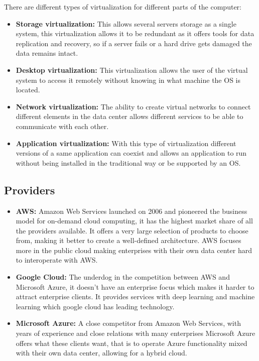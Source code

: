 There are different types of virtualization for different parts of the computer:

\begin{itemize}
	\item{\textbf{Storage virtualization:} This allows several servers storage as a single system, this virtualization allows it to be redundant as it offers tools for data replication and recovery, so if a server fails or a hard drive gets damaged the data remains intact.}
	\item{\textbf{Desktop virtualization:} This virtualization allows the user of the virtual system to access it remotely without knowing in what machine the OS is located.}
	\item{\textbf{Network virtualization:} The ability to create virtual networks to connect different elements in the data center allows different services to be able to communicate with each other.}
	\item{\textbf{Application virtualization:} With this type of virtualization different versions of a same application can coexist and allows an application to run without being installed in the traditional way or be supported by an OS.}
\end{itemize}

\subsection{Providers}\label{sec:chap3_prov}

\begin{itemize}
	\item{\textbf{AWS:} Amazon Web Services launched on 2006 and pioneered the business model for on-demand cloud computing, it has the highest market share of all the providers available. It offers a very large selection of products to choose from, making it better to create a well-defined architecture. AWS focuses more in the public cloud making enterprises with their own data center hard to interoperate with AWS.}
	\item{\textbf{Google Cloud:} The underdog in the competition between AWS and Microsoft Azure, it doesn’t have an enterprise focus which makes it harder to attract enterprise clients. It provides services with deep learning and machine learning which google cloud has leading technology.}
	\item{\textbf{Microsoft Azure:} A close competitor from Amazon Web Services, with years of experience and close relations with many enterprises Microsoft Azure offers what these clients want, that is to operate Azure functionality mixed with their own data center, allowing for a hybrid cloud.}
\end{itemize}

